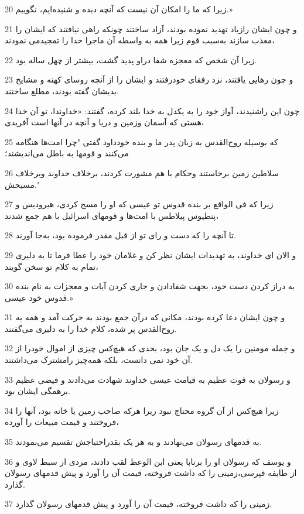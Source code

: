 \par 20 زیرا که ما را امکان آن نیست که آنچه دیده و شنیده‌ایم، نگوییم.»
\par 21 و چون ایشان رازیاد تهدید نموده بودند، آزاد ساختند چونکه راهی نیافتند که ایشان را معذب سازند به‌سبب قوم زیرا همه به واسطه آن ماجرا خدا را تمجیدمی نمودند،
\par 22 زیرا آن شخص که معجزه شفا دراو پدید گشت، بیشتر از چهل ساله بود.
\par 23 و چون رهایی یافتند، نزد رفقای خودرفتند و ایشان را از آنچه روسای کهنه و مشایخ بدیشان گفته بودند، مطلع ساختند.
\par 24 چون این راشنیدند، آواز خود را به یکدل به خدا بلند کرده، گفتند: «خداوندا، تو آن خدا هستی که آسمان وزمین و دریا و آنچه در آنها است آفریدی،
\par 25 که بوسیله روح‌القدس به زبان پدر ما و بنده خودداود گفتی "چرا امت‌ها هنگامه می‌کنند و قومها به باطل می‌اندیشند؛
\par 26 سلاطین زمین برخاستند وحکام با هم مشورت کردند، برخلاف خداوند وبرخلاف مسیحش."
\par 27 زیرا که فی الواقع بر بنده قدوس تو عیسی که او را مسح کردی، هیرودیس و پنطیوس پیلاطس با امت‌ها و قومهای اسرائیل با هم جمع شدند،
\par 28 تا آنچه را که دست و رای تو از قبل مقدر فرموده بود، به‌جا آورند.
\par 29 و الان ای خداوند، به تهدیدات ایشان نظر کن و غلامان خود را عطا فرما تا به دلیری تمام به کلام تو سخن گویند،
\par 30 به دراز کردن دست خود، بجهت شفادادن و جاری کردن آیات و معجزات به نام بنده قدوس خود عیسی.»
\par 31 و چون ایشان دعا کرده بودند، مکانی که درآن جمع بودند به حرکت آمد و همه به روح‌القدس پر شده، کلام خدا را به دلیری می‌گفتند.
\par 32 و جمله مومنین را یک دل و یک جان بود، بحدی که هیچ‌کس چیزی از اموال خودرا از آن خود نمی دانست، بلکه همه‌چیز رامشترک می‌داشتند.
\par 33 و رسولان به قوت عظیم به قیامت عیسی خداوند شهادت می‌دادند و فیضی عظیم برهمگی ایشان بود.
\par 34 زیرا هیچ‌کس از آن گروه محتاج نبود زیرا هر‌که صاحب زمین یا خانه بود، آنها را فروختند و قیمت مبیعات را آورده،
\par 35 به قدمهای رسولان می‌نهادند و به هر یک بقدراحتیاجش تقسیم می‌نمودند.
\par 36 و یوسف که رسولان او را برنابا یعنی ابن الوعظ لقب دادند، مردی از سبط لاوی و از طایفه قپرسی،زمینی را که داشت فروخته، قیمت آن را آورد و پیش قدمهای رسولان گذارد.
\par 37 زمینی را که داشت فروخته، قیمت آن را آورد و پیش قدمهای رسولان گذارد.


